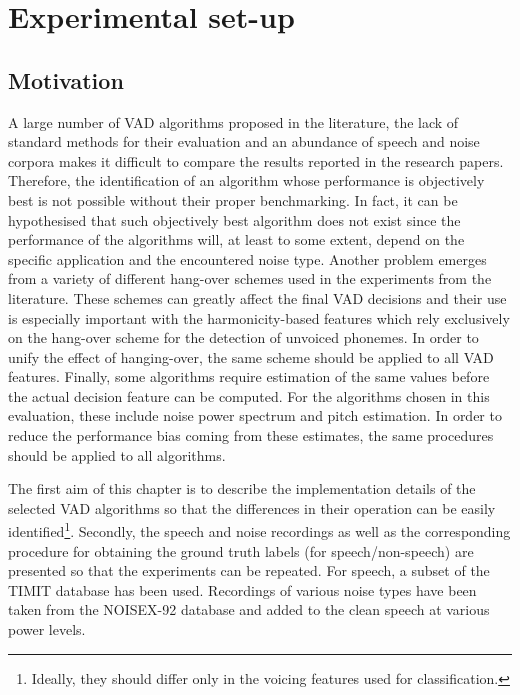 
\chapter{Experimental set-up} %

\label{Chapter3} %



\section{Motivation}

A large number of VAD algorithms proposed in the literature, the lack of standard methods for their evaluation and an abundance of speech and noise corpora makes it difficult to compare the results reported in the research papers. Therefore, the identification of an algorithm whose performance is objectively best is not possible without their proper benchmarking. In fact, it can be hypothesised that such objectively best algorithm does not exist since the performance of the algorithms will, at least to some extent, depend on the specific application and the encountered noise type. Another problem emerges from a variety of different hang-over schemes used in the experiments from the literature. These schemes can greatly affect the final VAD decisions and their use is especially important with the harmonicity-based features which rely exclusively on the hang-over scheme for the detection of unvoiced phonemes. In order to unify the effect of hanging-over, the same scheme should be applied to all VAD features. Finally, some algorithms require estimation of the same values before the actual decision feature can be computed. For the algorithms chosen in this evaluation, these include noise power spectrum and pitch estimation. In order to reduce the performance bias coming from these estimates, the same procedures should be applied to all algorithms.

The first aim of this chapter is to describe the implementation details of the selected VAD algorithms so that the differences in their operation can be easily identified\footnote{Ideally, they should differ only in the voicing features used for classification.}. Secondly, the speech and noise recordings as well as the corresponding procedure for obtaining the ground truth labels (for speech/non-speech) are presented so that the experiments can be repeated. For speech, a subset of the TIMIT \cite{TIMIT} database has been used. Recordings of various noise types have been taken from the NOISEX-92 \cite{NOISEX} database and added to the clean speech at various power levels.

